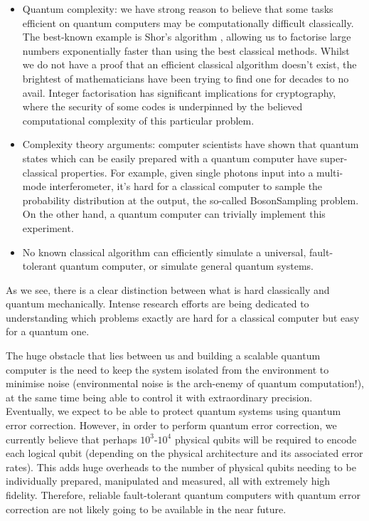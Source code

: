 \begin{itemize}
\item Quantum complexity: we have strong reason to believe that some tasks efficient on quantum computers may be computationally difficult classically. The best-known example is Shor's algorithm \cite{bib:shor1994algorithms}, allowing us to factorise large numbers exponentially  faster than using the best classical methods. Whilst we do not have a proof that an efficient classical algorithm doesn't exist, the brightest of mathematicians have been trying to find one for decades to no avail. Integer factorisation has significant implications for cryptography, where the security of some codes is underpinned by the believed computational complexity of this particular problem. 
\item Complexity theory arguments: computer scientists have shown that quantum states which can be easily prepared with a quantum computer have super-classical properties. For example, given single photons input into a multi-mode interferometer, it's hard for a classical computer to sample the probability distribution at the output, the so-called {\sc BosonSampling} problem. On the other hand, a quantum computer can trivially implement this experiment.
\item No known classical algorithm can efficiently simulate a universal, fault-tolerant quantum computer, or simulate general quantum systems.
\end{itemize}

As we see, there is a clear distinction between what is hard classically and quantum mechanically. Intense research efforts are being dedicated to understanding which problems exactly are hard for a classical computer but easy for a quantum one.

The huge obstacle that lies between us and building a scalable quantum computer is the need to keep the system isolated from the environment to minimise noise (environmental noise is the arch-enemy of quantum computation!), at the same time being able to control it with extraordinary precision. Eventually, we expect to be able to protect quantum systems using quantum error correction. However, in order to perform quantum error correction, we currently believe that perhaps $10^3$-$10^4$ physical qubits will be required to encode each logical qubit (depending on the physical architecture and its associated error rates). This adds huge overheads to the number of physical qubits needing to be individually prepared, manipulated and measured, all with extremely high fidelity. Therefore, reliable fault-tolerant quantum computers with quantum error correction are not likely going to be available in the near future.

